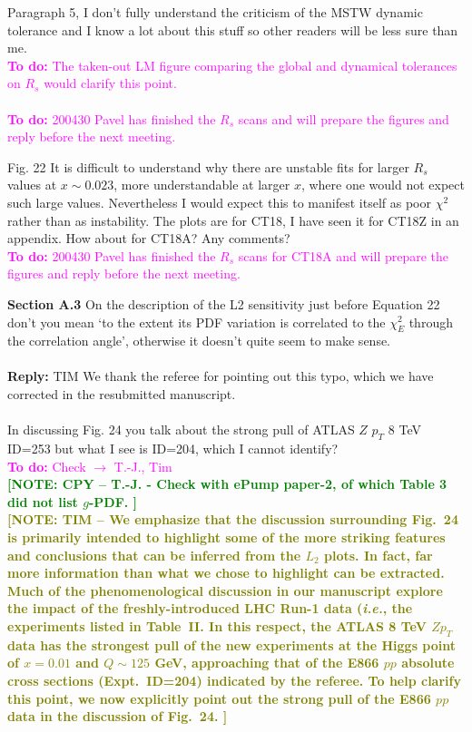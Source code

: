 \documentclass[aps,prd,amsmath,nofootinbib,floatfix,fleqn]{revtex4}
\newcommand{\TODO}[1]{\textcolor{magenta}{
\quad\vspace{3pt} \\ {\bf To do:} #1 \\
}}
\newcommand{\REPLY}[1]{\textcolor{redish}{\quad \\
{\bf Reply:} #1 \\
}}
\newcommand{\NOTECPY}[1]{\textcolor{green}{ \bf[NOTE: CPY -- #1 ]}}
\newcommand{\NOTETIM}[1]{\textcolor{olive}{ \bf[NOTE: TIM -- #1 ]}}
\begin{document}
\noindent
Paragraph 5, I don’t fully understand the criticism of the MSTW dynamic tolerance and I know a lot about this stuff so other readers will be less sure than me. 
\TODO{The taken-out LM figure comparing the global and dynamical tolerances on $R_s$ would clarify this point.}
\TODO{200430 Pavel has finished the $R_s$ scans and will prepare the figures and reply before the next meeting.}

\noindent
Fig. 22 It is difficult to understand why there are unstable fits for larger $R_s$ values at $x \sim 0.023$, more understandable at larger $x$, where one would not expect such large values. Nevertheless I would expect this to manifest itself as poor $\chi^2$ rather than as instability. The plots are for CT18, I have seen it for CT18Z in an appendix. How about for CT18A? Any comments?
\TODO{200430 Pavel has finished the $R_s$ scans for CT18A and will prepare the figures and reply before the next meeting.}



\noindent
{\bf Section A.3} On the description of the L2 sensitivity just before Equation 22 don’t you mean ‘to the extent its PDF variation is correlated to the $\chi^2_E$ through the correlation angle’, otherwise it doesn’t quite seem to make sense.\\
\REPLY{TIM We thank the referee for pointing out this typo, which we have corrected in the resubmitted manuscript.}\\

\noindent
In discussing Fig. 24 you talk about the strong pull of ATLAS $Z$ $p_T$ 8 TeV ID=253 but what I see is ID=204, which I cannot identify?  
\TODO{Check $\to$ T.-J., Tim}
\NOTECPY{T.-J. - Check with ePump paper-2, of which Table 3 did not list $g$-PDF. }\\
%
\NOTETIM{We emphasize that the discussion surrounding Fig.~24 is primarily intended to highlight some of the more striking features
and conclusions that can be inferred from the $L_2$ plots.  In fact, far more information than what we chose to highlight can be
extracted.  Much of the phenomenological discussion in our manuscript explore the impact of the freshly-introduced LHC
Run-1 data ({\it i.e.}, the experiments listed in Table~II.  In this respect, the ATLAS 8 TeV $Z p_T$ data has the strongest
pull of the new experiments at the Higgs point of $x=0.01$ and $Q\!\sim\!125$ GeV, approaching that of the E866 $pp$ absolute
cross sections (Expt.~ID=204) indicated by the referee.  To help clarify this point, we now explicitly point out the strong
pull of the E866 $pp$ data in the discussion of Fig.~24.}\\
\end{document}
